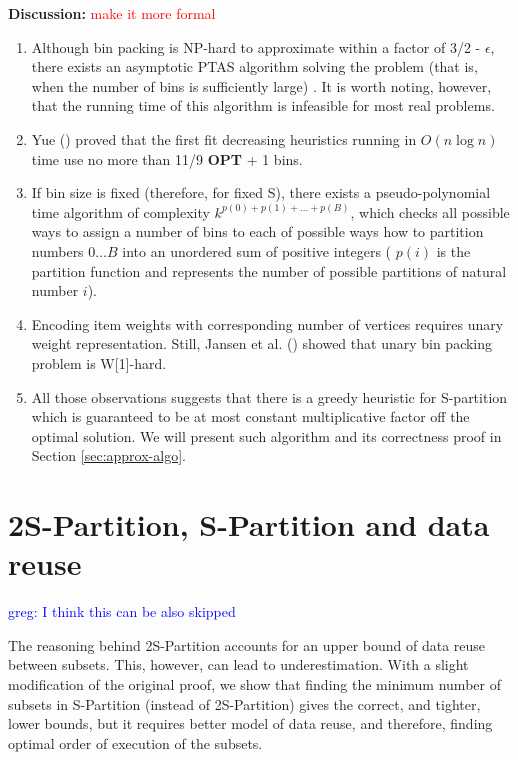 \documentclass[sigconf]{acmart}
\newcommand\todo[1]{\textcolor{red}{#1}}
\newcommand\greg[1]{\textcolor{blue}{greg: #1}}
\begin{document}
\textbf{Discussion:} \todo{make it more formal}

\begin{enumerate}
	\item Although bin packing is NP-hard to approximate within a factor of 3/2 
	- $\epsilon$, there exists an asymptotic PTAS algorithm solving the problem 
	(that is, when the number of bins is sufficiently large) 
	\cite{binpackingPTAS}. It is worth noting, however, that the running time 
	of this algorithm is infeasible for most real problems.
	\item Yue (\cite{binpackingApprox}) proved that the first fit decreasing 
	heuristics running in $O(n \log 
	n)$ time use no more than 11/9 \textbf{OPT} + 1 bins.
	\item If bin size is fixed (therefore, for fixed S), there exists a 
	pseudo-polynomial time algorithm 
	of complexity $k^{p(0)+p(1)+\dots+p(B)}$, which checks all possible ways to 
	assign a number of bins to each of possible ways how to partition numbers 
	$0 \dots B$ into an unordered sum of positive integers ( $p(i)$ is the 
	partition function and represents the number of possible partitions of 
	natural number $i$).
	\item Encoding item weights with corresponding number of vertices requires 
	unary weight representation. Still, Jansen et al. 
	(\cite{unaryBinPacking}) showed that unary bin packing problem is W[1]-hard.
	\item All those observations suggests that there is a greedy 
	heuristic for S-partition which is guaranteed to be at most constant 
	multiplicative factor off the optimal solution. We will present such 
	algorithm and its correctness proof in Section \ref{sec:approx-algo}.
\end{enumerate}

	\section{2S-Partition, S-Partition and data reuse}
\label{sec:Svs2S}

\greg{I think this can be also skipped}

The reasoning behind 2S-Partition accounts for an upper bound of data 
reuse 
between subsets.
This, however, can lead to underestimation. With a slight modification of 
the original proof, we show that finding the minimum number of subsets in 
S-Partition 
(instead of 
2S-Partition) gives the correct, and tighter, lower bounds, but it 
requires better model of data reuse, and therefore, finding optimal order 
of execution of the subsets.
\end{document}
